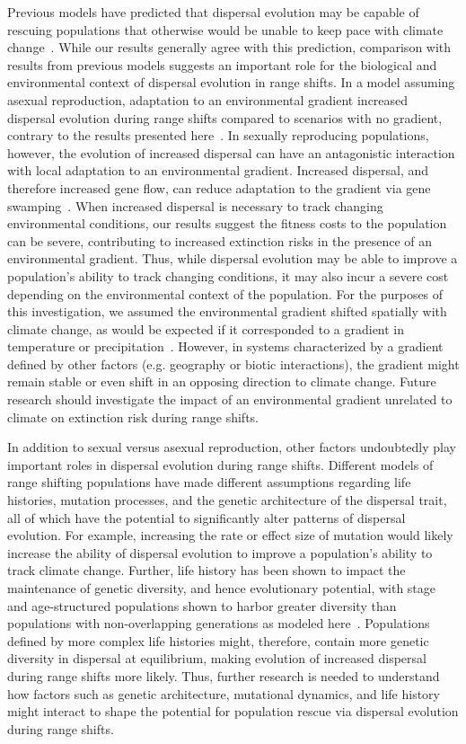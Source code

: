 \documentclass[11pt]{article}
\begin{document}
Previous models have predicted that dispersal evolution may be capable of rescuing populations that otherwise would be unable to keep pace with climate change~\citep{boeye2013more, henry2013eco}. While our results generally agree with this prediction, comparison with results from previous models suggests an important role for the biological and environmental context of dispersal evolution in range shifts. In a model assuming asexual reproduction, adaptation to an environmental gradient increased dispersal evolution during range shifts compared to scenarios with no gradient, contrary to the results presented here~\citep{hargreaves2015fitness}. In sexually reproducing populations, however, the evolution of increased dispersal can have an antagonistic interaction with local adaptation to an environmental gradient. Increased dispersal, and therefore increased gene flow, can reduce adaptation to the gradient via gene swamping~\citep{lenormand2002gene, kirkpatrick1997evolution}. When increased dispersal is necessary to track changing environmental conditions, our results suggest the fitness costs to the population can be severe, contributing to increased extinction risks in the presence of an environmental gradient. Thus, while dispersal evolution may be able to improve a population's ability to track changing conditions, it may also incur a severe cost depending on the environmental context of the population. For the purposes of this investigation, we assumed the environmental gradient shifted spatially with climate change, as would be expected if it corresponded to a gradient in temperature or precipitation~\citep{davis2001range}. However, in systems characterized by a gradient defined by other factors (e.g. geography or biotic interactions), the gradient might remain stable or even shift in an opposing direction to climate change. Future research should investigate the impact of an environmental gradient unrelated to climate on extinction risk during range shifts.

In addition to sexual versus asexual reproduction, other factors undoubtedly play important roles in dispersal evolution during range shifts. Different models of range shifting populations have made different assumptions regarding life histories, mutation processes, and the genetic architecture of the dispersal trait, all of which have the potential to significantly alter patterns of dispersal evolution. For example, increasing the rate or effect size of mutation would likely increase the ability of dispersal evolution to improve a population's ability to track climate change. Further, life history has been shown to impact the maintenance of genetic diversity, and hence evolutionary potential, with stage and age-structured populations shown to harbor greater diversity than populations with non-overlapping generations as modeled here~\citep{ellner1996environmental}. Populations defined by more complex life histories might, therefore, contain more genetic diversity in dispersal at equilibrium, making evolution of increased dispersal during range shifts more likely. Thus, further research is needed to understand how factors such as genetic architecture, mutational dynamics, and life history might interact to shape the potential for population rescue via dispersal evolution during range shifts.
\end{document}
